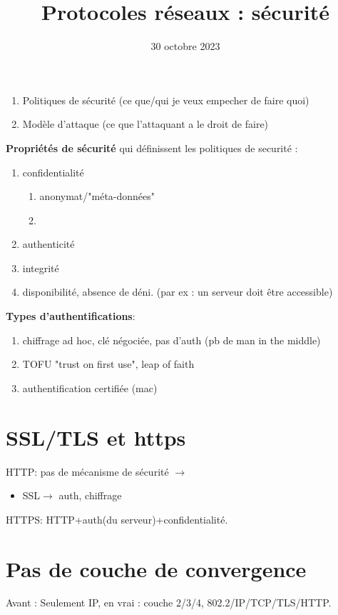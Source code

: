 \documentclass[12pt]{article}
\title{Protocoles réseaux : sécurité}
\date{30 octobre 2023}
\theoremstyle{plain}
\theoremstyle{definition}
\theoremstyle{remark}
\begin{document}
\maketitle
\begin{enumerate}
    \item Politiques de sécurité (ce que/qui je veux empecher de faire quoi)
    \item Modèle d'attaque (ce que l'attaquant a le droit de faire)
\end{enumerate}

\noindent \textbf{Propriétés de sécurité} qui définissent les politiques de securité :
\begin{enumerate}
    \item confidentialité \begin{enumerate}
        \item anonymat/"méta-données"
        \item 
    \end{enumerate}
    \item authenticité
    \item integrité
    \item disponibilité, absence de déni. (par ex : un serveur doit être accessible)
\end{enumerate}

\noindent \textbf{Types d'authentifications}:
\begin{enumerate}
    \item chiffrage ad hoc, clé négociée, pas d'auth (pb de man in the middle)
    \item TOFU "trust on first use", leap of faith
    \item authentification certifiée (mac)
\end{enumerate}

\section{SSL/TLS et https}
HTTP: pas de mécanisme de sécurité $\rightarrow$ \begin{itemize}
    \item SSL$\rightarrow$ auth, chiffrage
\end{itemize}

HTTPS: HTTP+auth(du serveur)+confidentialité.

\section{Pas de couche de convergence}
Avant : Seulement IP, en vrai : couche 2/3/4, 802.2/IP/TCP/TLS/HTTP. 
\end{document}

